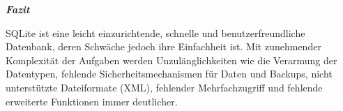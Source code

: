 \begin{large} \emph{\textbf{Fazit}} \end{large}
    SQLite ist eine leicht einzurichtende, schnelle und benutzerfreundliche Datenbank, deren Schwäche jedoch ihre Einfachheit ist.
    Mit zunehmender Komplexität der Aufgaben werden Unzulänglichkeiten wie die Verarmung der Datentypen, fehlende Sicherheitsmechanismen
    für Daten und Backups, nicht unterstützte Dateiformate (XML), fehlender Mehrfachzugriff und fehlende erweiterte Funktionen immer deutlicher.  